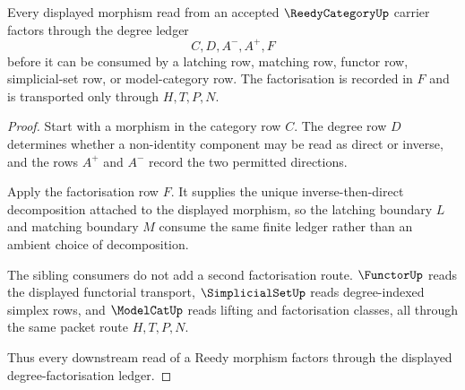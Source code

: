 \begin{theorem}
\label{thm:reedy-category-degree-factorization-ledger}
Every displayed morphism read from an accepted $\ReedyCategoryUp$ carrier factors through the degree ledger
$$
C,D,A^{-},A^{+},F
$$
before it can be consumed by a latching row, matching row, functor row, simplicial-set row, or model-category row. The factorisation is recorded in $F$ and is transported only through $H,T,P,N$.
\end{theorem}
\begin{proof}
Start with a morphism in the category row $C$. The degree row $D$ determines whether a non-identity component may be read as direct or inverse, and the rows $A^{+}$ and $A^{-}$ record the two permitted directions.

Apply the factorisation row $F$. It supplies the unique inverse-then-direct decomposition attached to the displayed morphism, so the latching boundary $L$ and matching boundary $M$ consume the same finite ledger rather than an ambient choice of decomposition.

The sibling consumers do not add a second factorisation route. $\FunctorUp$ reads the displayed functorial transport, $\SimplicialSetUp$ reads degree-indexed simplex rows, and $\ModelCatUp$ reads lifting and factorisation classes, all through the same packet route $H,T,P,N$.

Thus every downstream read of a Reedy morphism factors through the displayed degree-factorisation ledger.
\end{proof}


\begin{closurestatus}{\ReedyCategoryUp}
  \theoryclosure{\obligationClosure}
  \formalstatus{\unformalizedV}
\end{closurestatus}
